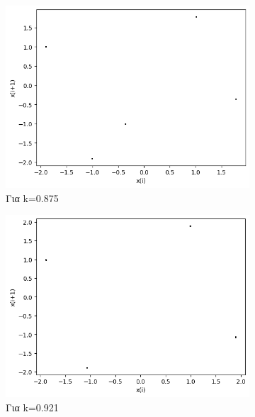 \begin{figure}[h!]
\begin{subfigure}[b]{0.4\textwidth}
		\includegraphics[width=\textwidth]{LateX images/graphs q19/g11}
		\caption{Για k=0.875}
		\label{f:k100}
	\end{subfigure}
	\hfill
	\begin{subfigure}[b]{0.4\textwidth}
		\centering
		\includegraphics[width=\textwidth]{LateX images/graphs q19/g12}
		\caption{Για k=0.921}
		\label{f:k101}
	\end{subfigure}
	\hfill
	\begin{subfigure}[b]{0.4\textwidth}
		\centering

\end{subfigure}
\end{figure}
